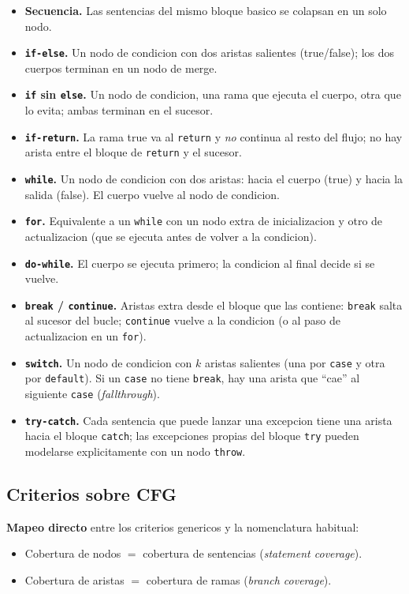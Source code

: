 \documentclass[12pt,a4paper]{article}
\begin{document}
\begin{itemize}
  \item \textbf{Secuencia.} Las sentencias del mismo bloque basico se colapsan en un solo nodo.
  \item \textbf{\texttt{if-else}.} Un nodo de condicion con dos aristas salientes (true/false);
  los dos cuerpos terminan en un nodo de merge.
  \item \textbf{\texttt{if} sin \texttt{else}.} Un nodo de condicion, una rama que ejecuta el
  cuerpo, otra que lo evita; ambas terminan en el sucesor.
  \item \textbf{\texttt{if-return}.} La rama true va al \texttt{return} y \emph{no} continua al
  resto del flujo; no hay arista entre el bloque de \texttt{return} y el sucesor.
  \item \textbf{\texttt{while}.} Un nodo de condicion con dos aristas: hacia el cuerpo (true) y
  hacia la salida (false). El cuerpo vuelve al nodo de condicion.
  \item \textbf{\texttt{for}.} Equivalente a un \texttt{while} con un nodo extra de inicializacion
  y otro de actualizacion (que se ejecuta antes de volver a la condicion).
  \item \textbf{\texttt{do-while}.} El cuerpo se ejecuta primero; la condicion al final decide
  si se vuelve.
  \item \textbf{\texttt{break} / \texttt{continue}.} Aristas extra desde el bloque que las
  contiene: \texttt{break} salta al sucesor del bucle; \texttt{continue} vuelve a la condicion
  (o al paso de actualizacion en un \texttt{for}).
  \item \textbf{\texttt{switch}.} Un nodo de condicion con $k$ aristas salientes (una por
  \texttt{case} y otra por \texttt{default}). Si un \texttt{case} no tiene \texttt{break}, hay
  una arista que ``cae'' al siguiente \texttt{case} (\textit{fallthrough}).
  \item \textbf{\texttt{try-catch}.} Cada sentencia que puede lanzar una excepcion tiene una
  arista hacia el bloque \texttt{catch}; las excepciones propias del bloque \texttt{try} pueden
  modelarse explicitamente con un nodo \texttt{throw}.
\end{itemize}

\subsection{Criterios sobre CFG}

\textbf{Mapeo directo} entre los criterios genericos y la nomenclatura habitual:
\begin{itemize}
  \item Cobertura de nodos $=$ cobertura de sentencias (\emph{statement coverage}).
  \item Cobertura de aristas $=$ cobertura de ramas (\emph{branch coverage}).
\end{itemize}
\end{document}
